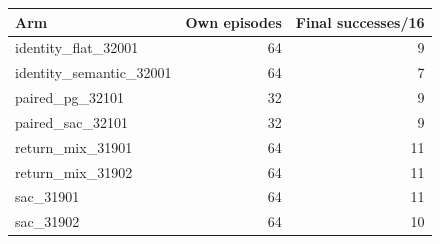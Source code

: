 \begin{tabular}{lrr}
Arm & Own episodes & Final successes/16 \\
\hline
identity\_flat\_32001 & 64 & 9 \\
identity\_semantic\_32001 & 64 & 7 \\
paired\_pg\_32101 & 32 & 9 \\
paired\_sac\_32101 & 32 & 9 \\
return\_mix\_31901 & 64 & 11 \\
return\_mix\_31902 & 64 & 11 \\
sac\_31901 & 64 & 11 \\
sac\_31902 & 64 & 10 \\
\end{tabular}
